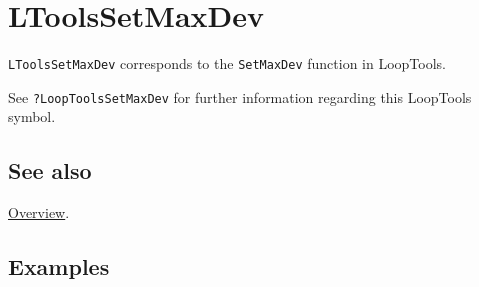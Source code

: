 \documentclass[../FeynHelpersManual.tex]{subfiles}
\begin{document}
\hypertarget{ltoolssetmaxdev}{
\section{LToolsSetMaxDev}\label{ltoolssetmaxdev}}

\texttt{LToolsSetMaxDev} corresponds to the \texttt{SetMaxDev} function
in LoopTools.

See \texttt{?LoopTools\textasciigrave SetMaxDev} for further information
regarding this LoopTools symbol.

\subsection{See also}

\hyperlink{toc}{Overview}.

\subsection{Examples}
\end{document}
